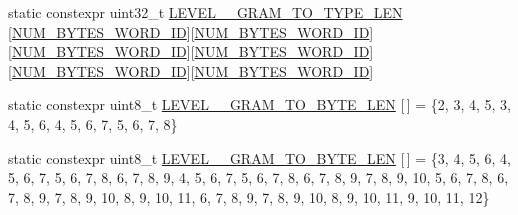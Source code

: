 \begin{DoxyCompactItemize}
static constexpr uint32\+\_\+t \hyperlink{classuva_1_1smt_1_1bpbd_1_1server_1_1lm_1_1m__grams_1_1m__gram__id_1_1_byte___m___gram___id_a9628997a876d0ad9216d8dd1b3ff96ea}{L\+E\+V\+E\+L\+\_\+\_\+\+G\+R\+A\+M\+\_\+\+T\+O\+\_\+\+T\+Y\+P\+E\+\_\+\+L\+E\+N} \mbox{[}\hyperlink{classuva_1_1smt_1_1bpbd_1_1server_1_1lm_1_1m__grams_1_1m__gram__id_1_1_byte___m___gram___id_abfb2441a9e2b433ef183d2f979979122}{N\+U\+M\+\_\+\+B\+Y\+T\+E\+S\+\_\+\+W\+O\+R\+D\+\_\+\+I\+D}\mbox{]}\mbox{[}\hyperlink{classuva_1_1smt_1_1bpbd_1_1server_1_1lm_1_1m__grams_1_1m__gram__id_1_1_byte___m___gram___id_abfb2441a9e2b433ef183d2f979979122}{N\+U\+M\+\_\+\+B\+Y\+T\+E\+S\+\_\+\+W\+O\+R\+D\+\_\+\+I\+D}\mbox{]}\mbox{[}\hyperlink{classuva_1_1smt_1_1bpbd_1_1server_1_1lm_1_1m__grams_1_1m__gram__id_1_1_byte___m___gram___id_abfb2441a9e2b433ef183d2f979979122}{N\+U\+M\+\_\+\+B\+Y\+T\+E\+S\+\_\+\+W\+O\+R\+D\+\_\+\+I\+D}\mbox{]}\mbox{[}\hyperlink{classuva_1_1smt_1_1bpbd_1_1server_1_1lm_1_1m__grams_1_1m__gram__id_1_1_byte___m___gram___id_abfb2441a9e2b433ef183d2f979979122}{N\+U\+M\+\_\+\+B\+Y\+T\+E\+S\+\_\+\+W\+O\+R\+D\+\_\+\+I\+D}\mbox{]}\mbox{[}\hyperlink{classuva_1_1smt_1_1bpbd_1_1server_1_1lm_1_1m__grams_1_1m__gram__id_1_1_byte___m___gram___id_abfb2441a9e2b433ef183d2f979979122}{N\+U\+M\+\_\+\+B\+Y\+T\+E\+S\+\_\+\+W\+O\+R\+D\+\_\+\+I\+D}\mbox{]}\mbox{[}\hyperlink{classuva_1_1smt_1_1bpbd_1_1server_1_1lm_1_1m__grams_1_1m__gram__id_1_1_byte___m___gram___id_abfb2441a9e2b433ef183d2f979979122}{N\+U\+M\+\_\+\+B\+Y\+T\+E\+S\+\_\+\+W\+O\+R\+D\+\_\+\+I\+D}\mbox{]}
\item 
static constexpr uint8\+\_\+t \hyperlink{classuva_1_1smt_1_1bpbd_1_1server_1_1lm_1_1m__grams_1_1m__gram__id_1_1_byte___m___gram___id_adc72d40d97c794544da3f9d70dac40e0}{L\+E\+V\+E\+L\+\_\+\_\+\+G\+R\+A\+M\+\_\+\+T\+O\+\_\+\+B\+Y\+T\+E\+\_\+\+L\+E\+N} \mbox{[}$\,$\mbox{]} = \{2, 3, 4, 5, 3, 4, 5, 6, 4, 5, 6, 7, 5, 6, 7, 8\}
\item 
static constexpr uint8\+\_\+t \hyperlink{classuva_1_1smt_1_1bpbd_1_1server_1_1lm_1_1m__grams_1_1m__gram__id_1_1_byte___m___gram___id_a3cd411cdeda61989f2061a4d7b4b5e2e}{L\+E\+V\+E\+L\+\_\+\_\+\+G\+R\+A\+M\+\_\+\+T\+O\+\_\+\+B\+Y\+T\+E\+\_\+\+L\+E\+N} \mbox{[}$\,$\mbox{]} = \{3, 4, 5, 6, 4, 5, 6, 7, 5, 6, 7, 8, 6, 7, 8, 9, 4, 5, 6, 7, 5, 6, 7, 8, 6, 7, 8, 9, 7, 8, 9, 10, 5, 6, 7, 8, 6, 7, 8, 9, 7, 8, 9, 10, 8, 9, 10, 11, 6, 7, 8, 9, 7, 8, 9, 10, 8, 9, 10, 11, 9, 10, 11, 12\}
\item 

\end{DoxyCompactItemize}
